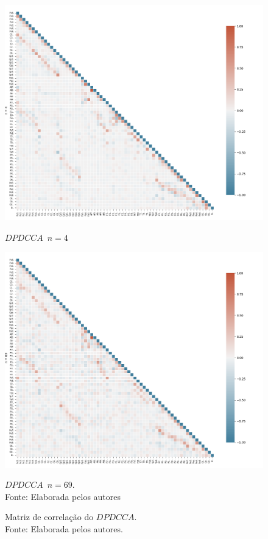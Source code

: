 \begin{figure}[ht]
  \begin{minipage}[b]{0.45\textwidth}
    \includegraphics[width=\textwidth]{./Figures/test_dmc/dpdcca4.png}
    \caption{$DPDCCA$~$n = 4$}
  \end{minipage}
  \hfill
  \begin{minipage}[b]{0.45\textwidth}
    \includegraphics[width=\textwidth]{./Figures/test_dmc/dpdcca69.png}
    \caption{$DPDCCA$~$n = 69$.\\Fonte: Elaborada pelos autores}
  \end{minipage}
  \captionsetup{justification=centering}
  \caption{Matriz de correlação do $DPDCCA$.\\Fonte: Elaborada pelos autores.}\label{fig:mat_cor_dpdcca}
\end{figure}



